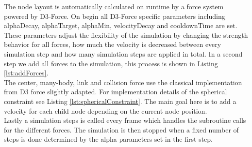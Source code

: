 The node layout is automatically calculated on runtime by a force system powered by D3-Force. On begin all D3-Force specific parameters including alphaDecay, alphaTarget, alphaMin, velocityDecay and cooldownTime are set. 
These parameters adjust the flexibility of the simulation by changing the strength behavior for all forces, how much the velocity is decreased between every simulation step and how many simulation steps are applied in total.
In a second step we add all forces to the simulation, this process is shown in Listing \ref{lst:addForces}.\\
The center, many-body, link and collision force use the classical implementation from D3 force slightly adapted. 
For implementation details of the spherical constraint see Listing \ref{lst:sphericalConstraint}. The main goal here is to add a velocity for each child node depending on the current node position.\\
Lastly a simulation steps is called every frame which handles the subroutine calls for the different forces. The simulation is then stopped when a fixed number of steps is done determined by the alpha parameters set in the first step.

